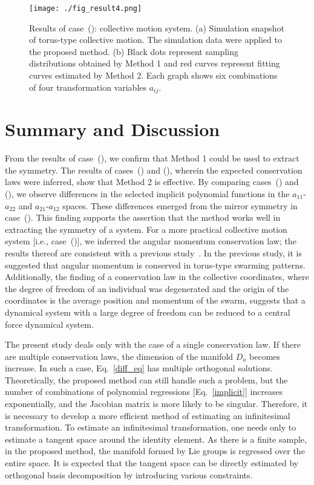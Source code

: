 \documentclass[preprint,
bibnotes,
 amsmath,amssymb,
 aps,
]{revtex4-1}
\newcounter{num}
\newcommand{\rnum}[1]{\setcounter{num}{#1}\roman{num}}
\begin{document}
\begin{figure}[htbp]
  \begin{center}
   \texttt{[image: ./fig\_result4.png]}
  \caption{Results of case~(\rnum{4}): collective motion system. (a) Simulation snapshot of torus-type collective motion. The simulation data were applied to the proposed method. 
(b) Black dots represent sampling distributions obtained by Method 1 and red curves represent fitting curves estimated by Method 2. Each graph shows six combinations of four transformation variables $a_{ij}$.}
  \label{fig_result4}
  \end{center}
\end{figure}


\section{Summary and Discussion}
\label{summary}
From the results of case~(\rnum{1}), we confirm that Method 1 could be used to extract the symmetry. 
The results of cases~(\rnum{2}) and (\rnum{3}), wherein the expected conservation laws were inferred, show that Method 2 is effective. 
By comparing cases~(\rnum{1}) and (\rnum{3}), we observe differences in the selected implicit polynomial functions in the $a_{11}$-$a_{22}$ and $a_{21}$-$a_{12}$ spaces. 
These differences emerged from the mirror symmetry in case~(\rnum{1}). 
This finding supports the assertion that the method works well in extracting the symmetry of a system. 
For a more practical collective motion system [i.e., case~(\rnum{4})], we inferred the angular momentum conservation law; the results thereof are consistent with a previous study~\cite{couzin2002collective}. In the previous study, it is suggested that angular momentum is conserved in torus-type swarming patterns. 
Additionally, the finding of a conservation law in the collective coordinates, where the degree of freedom of an individual was degenerated and the origin of the coordinates is the average position and momentum of the swarm, suggests that a dynamical system with a large degree of freedom can be reduced to a central force dynamical system.\par
The present study deals only with the case of a single conservation law. If there are multiple conservation laws, the dimension of the manifold $D_a$ becomes increase. In such a case, Eq.~\eqref{diff_eq} has multiple orthogonal solutions. Theoretically, the proposed method can still handle such a problem, but the number of combinations of polynomial regressions [Eq.~\eqref{implicit}] increases exponentially, and the Jacobian matrix is more likely to be singular. Therefore, it is necessary to develop a more efficient method of estimating an infinitesimal transformation. To estimate an infinitesimal transformation, one needs only to estimate a tangent space around the identity element. As there is a finite sample, in the proposed method, the manifold formed by Lie groups is regressed over the entire space. It is expected that the tangent space can be directly estimated by orthogonal basis decomposition by introducing various constraints.\par
\end{document}
